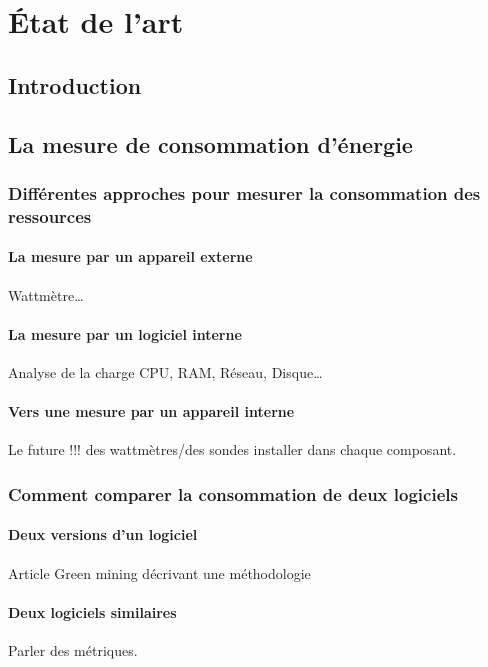 \documentclass[a4paper, 11pt]{report}
\begin{document}
\chapter{État de l'art}
	\section{Introduction}

	\section{La mesure de consommation d'énergie}
		\subsection{Différentes approches pour mesurer la consommation des ressources}
			\subsubsection{La mesure par un appareil externe}
Wattmètre\ldots

			\subsubsection{La mesure par un logiciel interne}
Analyse de la charge CPU, RAM, Réseau, Disque\ldots

			\subsubsection{Vers une mesure par un appareil interne}
Le future !!! des wattmètres/des sondes installer dans chaque composant.
		
		\subsection{Comment comparer la consommation de deux logiciels}
			\subsubsection{Deux versions d'un logiciel}
Article Green mining\cite{GreenMining} décrivant une méthodologie

			\subsubsection{Deux logiciels similaires}
Parler des métriques.
\end{document}
